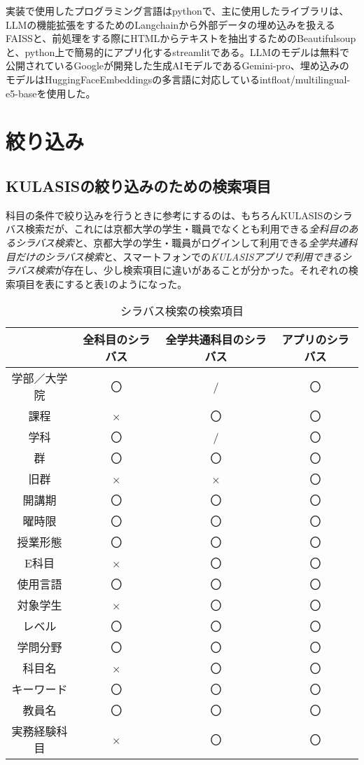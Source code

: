 実装で使用したプログラミング言語はpythonで、主に使用したライブラリは、LLMの機能拡張をするためのLangchainから外部データの埋め込みを扱えるFAISSと、前処理をする際にHTMLからテキストを抽出するためのBeautifulsoupと、python上で簡易的にアプリ化するstreamlitである。LLMのモデルは無料で公開されているGoogleが開発した生成AIモデルであるGemini-pro、埋め込みのモデルはHuggingFaceEmbeddingsの多言語に対応しているintfloat/multilingual-e5-baseを使用した。\\

\section{絞り込み}
\subsection{KULASISの絞り込みのための検索項目}
科目の条件で絞り込みを行うときに参考にするのは、もちろんKULASISのシラバス検索だが、これには京都大学の学生・職員でなくとも利用できる\emph{全科目のあるシラバス検索}と、京都大学の学生・職員がログインして利用できる\emph{全学共通科目だけのシラバス検索}と、スマートフォンでの\emph{KULASISアプリで利用できるシラバス検索}が存在し、少し検索項目に違いがあることが分かった。それぞれの検索項目を表にすると表1のようになった。\\

\begin{table}[h]
\centering
\caption{シラバス検索の検索項目}
\begin{tabular}{cccc}\hline
 & 全科目のシラバス & 全学共通科目のシラバス & アプリのシラバス\\ \hline
学部／大学院& 〇 & / & 〇\\
課程& × & 〇 & 〇\\
学科& 〇 & / & 〇\\
群& 〇 & 〇 & 〇\\
旧群& ×& × & 〇\\
開講期& 〇 & 〇 & 〇\\
曜時限& 〇 & 〇 & 〇\\
授業形態& 〇 & 〇 & 〇\\
E科目& × & 〇 & 〇\\
使用言語& 〇 & 〇 & 〇\\
対象学生& × & 〇 & 〇\\
レベル& 〇 & 〇 & 〇\\
学問分野& 〇 & 〇 & 〇\\
科目名& × & 〇 & 〇\\
キーワード& 〇 & 〇 & 〇\\
教員名& 〇 & 〇 & 〇\\
実務経験科目& × & 〇 & 〇\\ \hline
\end{tabular}
\end{table}

